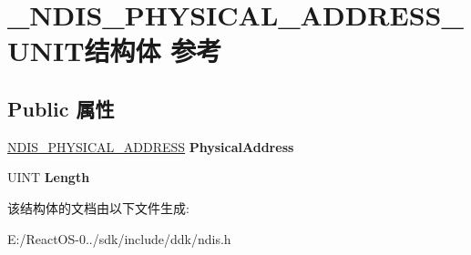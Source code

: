 \hypertarget{struct___n_d_i_s___p_h_y_s_i_c_a_l___a_d_d_r_e_s_s___u_n_i_t}{}\section{\+\_\+\+N\+D\+I\+S\+\_\+\+P\+H\+Y\+S\+I\+C\+A\+L\+\_\+\+A\+D\+D\+R\+E\+S\+S\+\_\+\+U\+N\+I\+T结构体 参考}
\label{struct___n_d_i_s___p_h_y_s_i_c_a_l___a_d_d_r_e_s_s___u_n_i_t}
\subsection*{Public 属性}
\begin{DoxyCompactItemize}
\item 
\mbox{\label{struct___n_d_i_s___p_h_y_s_i_c_a_l___a_d_d_r_e_s_s___u_n_i_t_ae6b5194586b3ac92d2d11152b4012c64}} 
\hyperlink{union___l_a_r_g_e___i_n_t_e_g_e_r}{N\+D\+I\+S\+\_\+\+P\+H\+Y\+S\+I\+C\+A\+L\+\_\+\+A\+D\+D\+R\+E\+SS} {\bfseries Physical\+Address}
\item 
\mbox{\label{struct___n_d_i_s___p_h_y_s_i_c_a_l___a_d_d_r_e_s_s___u_n_i_t_a0773caa02cf578296e43f7923bcb6f2c}} 
U\+I\+NT {\bfseries Length}
\end{DoxyCompactItemize}


该结构体的文档由以下文件生成\+:\begin{DoxyCompactItemize}
\item 
E\+:/\+React\+O\+S-\/0../sdk/include/ddk/ndis.\+h\end{DoxyCompactItemize}
